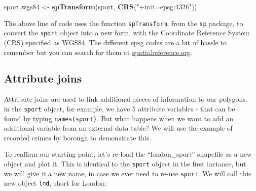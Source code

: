 \documentclass[]{article}
\newenvironment{Shaded}{}{}
\newcommand{\KeywordTok}[1]{\textcolor[rgb]{0.00,0.44,0.13}{\textbf{{#1}}}}
\newcommand{\StringTok}[1]{\textcolor[rgb]{0.25,0.44,0.63}{{#1}}}
\newcommand{\NormalTok}[1]{{#1}}
\begin{document}
\begin{Shaded}
\begin{Highlighting}[]
\NormalTok{sport.wgs84 <- }\KeywordTok{spTransform}\NormalTok{(sport, }\KeywordTok{CRS}\NormalTok{(}\StringTok{"+init=epsg:4326"}\NormalTok{))}
\end{Highlighting}
\end{Shaded}
The above line of code uses the function \texttt{spTransform}, from the
\texttt{sp} package, to convert the \texttt{sport} object into a new
form, with the Coordinate Reference System (CRS) specified as WGS84. The
different epsg codes are a bit of hassle to remember but you can search
for them at \href{http://spatialreference.org/}{spatialreference.org}.

\subsection{Attribute joins}

Attribute joins are used to link additional pieces of information to our
polygons. in the \texttt{sport} object, for example, we have 5 attribute
variables - that can be found by typing \texttt{names(sport)}. But what
happens when we want to add an additional variable from an external data
table? We will use the example of recorded crimes by borough to
demonstrate this.

To reaffirm our starting point, let's re-load the ``london\_sport''
shapefile as a new object and plot it. This is identical to the
\texttt{sport} object in the first instance, but we will give it a new
name, in case we ever need to re-use \texttt{sport}. We will call this
new object \texttt{lnd}, short for London:
\end{document}
